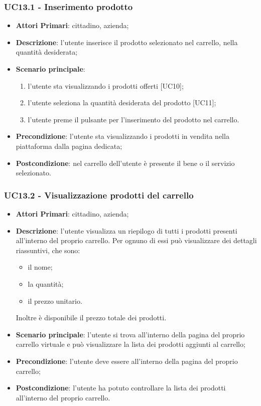  \subsubsection{UC13.1 - Inserimento prodotto}
\begin{itemize}
	\item \textbf{Attori Primari}: cittadino, azienda;
	\item \textbf{Descrizione}: l'utente inserisce il prodotto selezionato nel carrello, nella quantità desiderata;
	\item \textbf{Scenario principale}:
	\begin{enumerate}[label=\alph*.]
		\item l'utente sta visualizzando i prodotti offerti [UC10];
		\item l'utente seleziona la quantità desiderata del prodotto [UC11];
		\item l'utente preme il pulsante per l'inserimento del prodotto nel carrello.
	\end{enumerate}
	\item \textbf{Precondizione}: l'utente sta visualizzando i prodotti in vendita nella piattaforma dalla pagina dedicata;
	\item \textbf{Postcondizione}: nel carrello dell'utente è presente il bene o il servizio selezionato.
\end{itemize}
\subsubsection{UC13.2 - Visualizzazione prodotti del carrello}
\begin{itemize}
	\item \textbf{Attori Primari}: cittadino, azienda;
	\item \textbf{Descrizione}: l'utente visualizza un riepilogo di tutti i prodotti presenti all'interno del proprio carrello. Per ognuno di essi può visualizzare dei dettagli riassuntivi, che sono:
	\begin{itemize}
		\item il nome;
		\item la quantità;
		\item il prezzo unitario.
	\end{itemize}
	Inoltre è disponibile il prezzo totale dei prodotti.

	\item \textbf{Scenario principale}: l'utente si trova all'interno della pagina del proprio carrello virtuale e può visualizzare la lista dei prodotti aggiunti al carrello;
	\item \textbf{Precondizione}: l'utente deve essere all'interno della pagina del proprio carrello;
	\item \textbf{Postcondizione}: l'utente ha potuto controllare la lista dei prodotti all'interno del proprio carrello.
\end{itemize}

